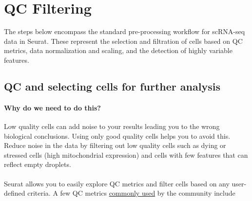 \documentclass[
]{book}
\begin{document}
\hypertarget{qc}{%
\chapter{QC Filtering}\label{qc}}

The steps below encompass the standard pre-processing workflow for scRNA-seq data in Seurat. These represent the selection and filtration of cells based on QC metrics, data normalization and scaling, and the detection of highly variable features.

\hypertarget{qc-and-selecting-cells-for-further-analysis}{%
\section{QC and selecting cells for further analysis}\label{qc-and-selecting-cells-for-further-analysis}}

\hypertarget{why-do-we-need-to-do-this}{%
\subsubsection*{Why do we need to do this?}\label{why-do-we-need-to-do-this}}

Low quality cells can add noise to your results leading you to the wrong biological conclusions. Using only good quality cells helps you to avoid this. Reduce noise in the data by filtering out low quality cells such as dying or stressed cells (high mitochondrial expression) and cells with few features that can reflect empty droplets.

\hypertarget{section-1}{%
\subsubsection*{}\label{section-1}}

Seurat allows you to easily explore QC metrics and filter cells based on any user-defined criteria. A few QC metrics \href{https://www.ncbi.nlm.nih.gov/pmc/articles/PMC4758103/}{commonly used} by the community include
\end{document}
